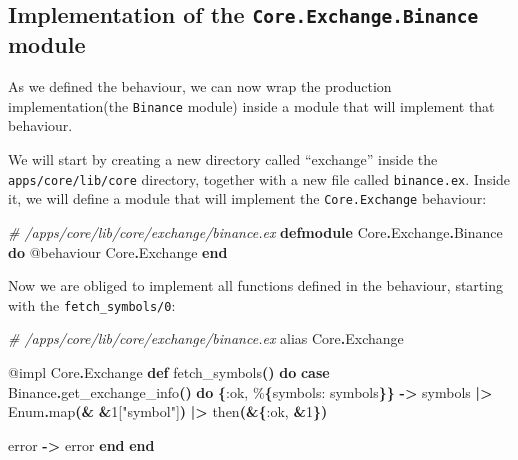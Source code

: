 \documentclass[
  oneside]{book}
\newenvironment{Shaded}{\begin{snugshade}}{\end{snugshade}}
\newcommand{\CommentTok}[1]{\textcolor[rgb]{0.56,0.35,0.01}{\textit{#1}}}
\newcommand{\ConstantTok}[1]{\textcolor[rgb]{0.56,0.35,0.01}{#1}}
\newcommand{\DecValTok}[1]{\textcolor[rgb]{0.00,0.00,0.81}{#1}}
\newcommand{\FunctionTok}[1]{\textcolor[rgb]{0.13,0.29,0.53}{\textbf{#1}}}
\newcommand{\ImportTok}[1]{#1}
\newcommand{\KeywordTok}[1]{\textcolor[rgb]{0.13,0.29,0.53}{\textbf{#1}}}
\newcommand{\NormalTok}[1]{#1}
\newcommand{\OperatorTok}[1]{\textcolor[rgb]{0.81,0.36,0.00}{\textbf{#1}}}
\newcommand{\OtherTok}[1]{\textcolor[rgb]{0.56,0.35,0.01}{#1}}
\newcommand{\StringTok}[1]{\textcolor[rgb]{0.31,0.60,0.02}{#1}}
\newcommand{\VariableTok}[1]{\textcolor[rgb]{0.00,0.00,0.00}{#1}}
\begin{document}
\subsection{\texorpdfstring{Implementation of the \texttt{Core.Exchange.Binance} module}{Implementation of the Core.Exchange.Binance module}}\label{implementation-of-the-core.exchange.binance-module}

As we defined the behaviour, we can now wrap the production implementation(the \texttt{Binance} module) inside a module that will implement that behaviour.

We will start by creating a new directory called ``exchange'' inside the \texttt{apps/core/lib/core} directory, together with a new file called \texttt{binance.ex}. Inside it, we will define a module that will implement the \texttt{Core.Exchange} behaviour:

\begin{Shaded}
\begin{Highlighting}[]
\CommentTok{\# /apps/core/lib/core/exchange/binance.ex}
\KeywordTok{defmodule} \ConstantTok{Core}\OperatorTok{.}\ConstantTok{Exchange}\OperatorTok{.}\ConstantTok{Binance} \KeywordTok{do}
  \OtherTok{@behaviour} \ConstantTok{Core}\OperatorTok{.}\ConstantTok{Exchange}
\KeywordTok{end}
\end{Highlighting}
\end{Shaded}

Now we are obliged to implement all functions defined in the behaviour, starting with the \texttt{fetch\_symbols/0}:

\begin{Shaded}
\begin{Highlighting}[]
  \CommentTok{\# /apps/core/lib/core/exchange/binance.ex}
  \ImportTok{alias} \ConstantTok{Core}\OperatorTok{.}\ConstantTok{Exchange}

  \OtherTok{@impl} \ConstantTok{Core}\OperatorTok{.}\ConstantTok{Exchange}
  \KeywordTok{def}\NormalTok{ fetch\_symbols}\FunctionTok{()} \KeywordTok{do}
    \KeywordTok{case} \ConstantTok{Binance}\OperatorTok{.}\NormalTok{get\_exchange\_info}\FunctionTok{()} \KeywordTok{do}
      \FunctionTok{\{}\VariableTok{:ok}\NormalTok{, \%}\FunctionTok{\{}\VariableTok{symbols:}\NormalTok{ symbols}\FunctionTok{\}\}} \OperatorTok{{-}\textgreater{}}
\NormalTok{        symbols}
        \OperatorTok{|\textgreater{}} \ConstantTok{Enum}\OperatorTok{.}\NormalTok{map}\FunctionTok{(}\OperatorTok{\&} \OperatorTok{\&}\DecValTok{1}\OtherTok{[}\StringTok{"symbol"}\OtherTok{]}\FunctionTok{)}
        \OperatorTok{|\textgreater{}}\NormalTok{ then}\FunctionTok{(}\OperatorTok{\&}\FunctionTok{\{}\VariableTok{:ok}\NormalTok{, }\OperatorTok{\&}\DecValTok{1}\FunctionTok{\})}

\NormalTok{      error }\OperatorTok{{-}\textgreater{}}
\NormalTok{        error}
    \KeywordTok{end}
  \KeywordTok{end}
\end{Highlighting}
\end{Shaded}
\end{document}
